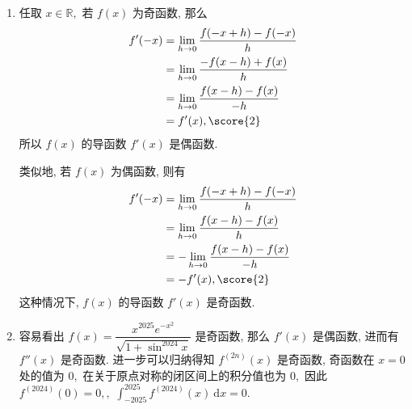 \begin{solution}
\begin{enumerate}
\item 任取 $x \in \mathbb{R},$ 若 $f(x)$ 为奇函数, 那么
\begin{align*}
f'(-x) & = \lim_{h\to 0} \dfrac{f(-x+h) - f(-x)}{h} \\
& = \lim_{h\to 0} \dfrac{-f(x-h) + f(x)}{h} \\
& = \lim_{h\to 0} \dfrac{f(x-h) - f(x)}{-h} \\
& = f'(x), \score{2}
\end{align*}
所以 $f(x)$ 的导函数 $f'(x)$ 是偶函数.

类似地, 若 $f(x)$ 为偶函数, 则有
\begin{align*}
f'(-x) & = \lim_{h\to 0} \dfrac{f(-x+h) - f(-x)}{h} \\
& = \lim_{h\to 0} \dfrac{f(x-h) - f(x)}{h} \\
& = - \lim_{h\to 0} \dfrac{f(x-h) - f(x)}{-h} \\
& = -f'(x), \score{2}
\end{align*}
这种情况下, $f(x)$ 的导函数 $f'(x)$ 是奇函数.


\item 容易看出 $\displaystyle f(x) = \dfrac{x^{2025} e^{-x^2}}{\sqrt{1 + \sin^{2024} x}}$ 是奇函数, 
那么 $f'(x)$ 是偶函数, 进而有 $f''(x)$ 是奇函数. 进一步可以归纳得知 $f^{(2n)}(x)$ 是奇函数, 
奇函数在 $x = 0$ 处的值为 $0,$ 在关于原点对称的闭区间上的积分值也为 $0,$ 
因此 $f^{(2024)}(0) = 0,,$ $\displaystyle \int_{-2025}^{2025} f^{(2024)}(x) ~ \mathrm{d} x = 0.$ 
\end{enumerate}
\end{solution}



